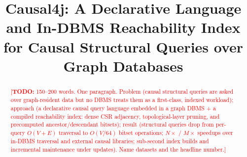 \documentclass[conference]{IEEEtran}
\newcommand{\TODO}[1]{\textcolor{red}{[\textbf{TODO:} #1]}}
\begin{document}
\title{Causal4j: A Declarative Language and In-DBMS Reachability
Index for Causal Structural Queries over Graph Databases}

\author{
\and
{}
\and
{}
\and
{}
}

\maketitle

\begin{abstract}
\TODO{150--200 words. One paragraph. Problem (causal structural queries are
asked over graph-resident data but no DBMS treats them as a first-class,
indexed workload); approach (a declarative causal query language embedded in a
graph DBMS + a compiled reachability index: dense CSR adjacency, topological-layer
pruning, and precomputed ancestor/descendant bitsets); result (structural
queries drop from per-query $O(V{+}E)$ traversal to $O(V/64)$ bitset operations;
$N\times$ / $M\times$ speedups over in-DBMS traversal and external causal
libraries; sub-second index builds and incremental maintenance under updates).
Name datasets and the headline number.}
\end{abstract}
\end{document}
